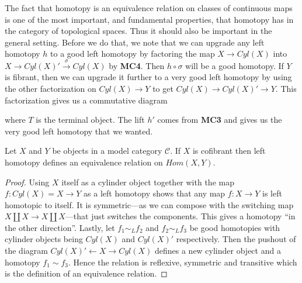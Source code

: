 The fact that homotopy is an equivalence relation on classes of continuous maps is one of the most important, and fundamental properties, that homotopy has in the category of topological spaces. Thus it should also be important in the general setting. Before we do that, we note that we can upgrade any left homotopy $h$ to a good left homotopy by factoring the map $X\rightarrow Cyl(X)$ into $X\rightarrow Cyl(X)' \overset{\sigma}\rightarrow Cyl(X)$ by \textbf{MC4}. Then $h\circ \sigma$ will be a good homotopy. If $Y$ is fibrant, then we can upgrade it further to a very good left homotopy by using the other factorization on $Cyl(X)\rightarrow Y$ to get $Cyl(X)\rightarrow Cyl(X)'\rightarrow Y$. This factorization gives us a commutative diagram
\begin{center}
\end{center}
where $T$ is the terminal object. The lift $h'$ comes from \textbf{MC3} and gives us the very good left homotopy that we wanted. 

\begin{lemma}
Let $X$ and $Y$ be objects in a model category $\mathcal{C}$. If $X$ is cofibrant then left homotopy defines an equivalence relation on $Hom(X,Y)$.
\end{lemma}
\begin{proof}
Using $X$ itself as a cylinder object together with the map $f:Cyl(X)=X\rightarrow Y$ as a left homotopy shows that any map $f:X\rightarrow Y$ is left homotopic to itself. It is symmetric---as we can compose with the switching map $X\coprod X \rightarrow X\coprod X$---that just switches the components. This gives a homotopy “in the other direction”. Lastly, let $f_1\sim_L f_2$ and $f_2\sim_L f_3$ be good homotopies with cylinder objects being $Cyl(X)$ and $Cyl(X)'$ respectively. Then the pushout of the diagram $Cyl(X)' \leftarrow X \rightarrow Cyl(X)$ defines a new cylinder object and a homotopy $f_1\sim f_3$. Hence the relation is reflexive, symmetric and transitive which is the definition of an equivalence relation.
\end{proof}

